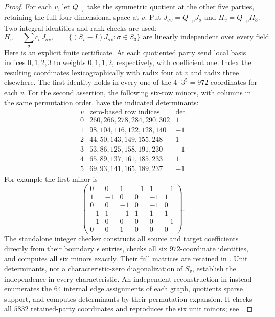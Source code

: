 \begin{proof}
For each $v$, let $Q_{-v}$ take the symmetric quotient at the other five
parties, retaining the full four-dimensional space at $v$. Put
$J_{\sigma v}=Q_{-v}J_\sigma$ and $H_v=Q_{-v}H_3$. Two integral identities
and rank checks are used:
\[
 H_v=\sum_\sigma c_\sigma J_{\sigma v},\qquad
 \{(S_v-I)J_{\sigma v}:\sigma\in S_3\}
       \text{ are linearly independent over every field}.
 \tag{PG-CAUCHY-retained}
\]
Here is an explicit finite certificate. At each quotiented party send local
basis indices $0,1,2,3$ to weights $0,1,1,2$, respectively, with coefficient
one. Index the resulting coordinates lexicographically with radix four at
$v$ and radix three elsewhere. The first identity holds in every one of
the $4\cdot3^5=972$ coordinates for each $v$. For the second assertion,
the following six-row minors, with columns in the same permutation order,
have the indicated determinants:
\[
\begin{array}{c|l|r}
 v&\text{zero-based row indices}&\det\\\hline
0&260,266,278,284,290,302&1\\
1&98,104,116,122,128,140&-1\\
2&44,50,143,149,155,248&1\\
3&53,86,125,158,191,230&-1\\
4&65,89,137,161,185,233&1\\
5&69,93,141,165,189,237&-1
\end{array}
\]
For example the first minor is
\[
\begin{pmatrix}
0&0&1&-1&1&-1\\
1&-1&0&0&-1&1\\
0&0&-1&0&-1&0\\
-1&1&-1&1&1&1\\
-1&0&0&0&0&-1\\
0&0&1&0&0&0
\end{pmatrix}.
\]
The standalone integer checker
 constructs all source and
target coefficients directly from their boundary $\epsilon$ entries,
checks all six $972$-coordinate identities, and computes all six minors
exactly. Their full matrices are retained in
. Unit determinants,
not a characteristic-zero diagonalization of $S_v$, establish the
independence in every characteristic. An independent reconstruction in
 instead enumerates the $64$
internal edge assignments of each graph, quotients sparse support, and
computes determinants by their permutation expansion. It checks all $5832$
retained-party coordinates and reproduces the six unit minors; see
.


\end{proof}
